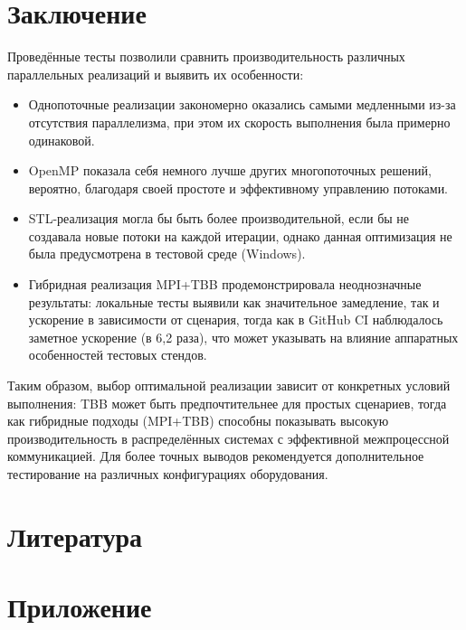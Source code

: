 \documentclass[12pt,a4paper]{extarticle}
\begin{document}
\section{Заключение}
Проведённые тесты позволили сравнить производительность различных параллельных реализаций и выявить их особенности:
\begin{itemize}
    \item Однопоточные реализации закономерно оказались самыми медленными из-за отсутствия параллелизма, при этом их скорость выполнения была примерно одинаковой.
    \item OpenMP показала себя немного лучше других многопоточных решений, вероятно, благодаря своей простоте и эффективному управлению потоками.
    \item STL-реализация могла бы быть более производительной, если бы не создавала новые потоки на каждой итерации, однако данная оптимизация не была предусмотрена в тестовой среде (Windows).
    \item Гибридная реализация MPI+TBB продемонстрировала неоднозначные результаты: локальные тесты выявили как значительное замедление, так и ускорение в зависимости от сценария, тогда как в GitHub CI наблюдалось заметное ускорение (в 6,2 раза), что может указывать на влияние аппаратных особенностей тестовых стендов.
\end{itemize}
Таким образом, выбор оптимальной реализации зависит от конкретных условий выполнения: TBB может быть предпочтительнее для простых сценариев, тогда как гибридные подходы (MPI+TBB) способны показывать высокую производительность в распределённых системах с эффективной межпроцессной коммуникацией. Для более точных выводов рекомендуется дополнительное тестирование на различных конфигурациях оборудования.

 

\newpage
\section{Литература}

\newpage
\section{Приложение}
\end{document}
